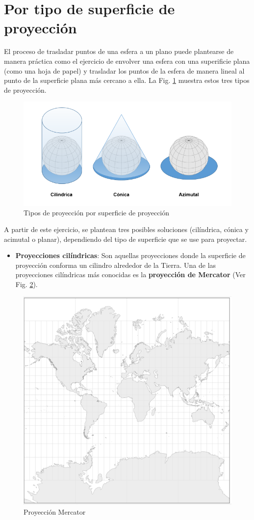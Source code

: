 \documentclass[
]{book}
\providecommand{\tightlist}{%
  \setlength{\itemsep}{0pt}\setlength{\parskip}{0pt}}
\begin{document}
\hypertarget{por-tipo-de-superficie-de-proyecciuxf3n}{%
\section{Por tipo de superficie de proyección}\label{por-tipo-de-superficie-de-proyecciuxf3n}}

El proceso de trasladar puntos de una esfera a un plano puede plantearse de
manera práctica como el ejercicio de envolver una esfera con una superificie
plana (como una hoja de papel) y trasladar los puntos de la esfera de manera
lineal al punto de la superficie plana más cercano a ella. La Fig.
\ref{fig:fi-proys} muestra estos tres tipos de proyección.

\begin{figure}

{\centering \includegraphics[width=0.6\linewidth]{img/tipos_proy} 

}

\caption{Tipos de proyección por superficie de proyección}\label{fig:fi-proys}
\end{figure}

A partir de este ejercicio, se plantean tres posibles soluciones (cilíndrica,
cónica y acimutal o planar), dependiendo del tipo de superficie que se use para
proyectar.

\begin{itemize}
\tightlist
\item
  \textbf{Proyecciones cilíndricas}: Son aquellas proyecciones donde la superficie
  de proyección conforma un cilindro alrededor de la Tierra. Una de las
  proyecciones cilíndricas más conocidas es la \textbf{proyección de Mercator} (Ver
  Fig. \ref{fig:mercator}).
\end{itemize}

\begin{figure}

{\centering \includegraphics[width=0.4\linewidth]{img/mercator} 

}

\caption{Proyección Mercator}\label{fig:mercator}
\end{figure}
\end{document}
